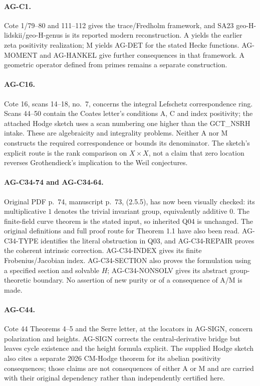 \paragraph{AG-C1.} Cote 1/79--80 and 111--112 gives the trace/Fredholm
framework, and SA23 geo-H-lidskii/geo-H-genus is its reported modern
reconstruction. A yields the earlier zeta positivity realization;
M yields AG-DET for the stated Hecke functions. AG-MOMENT and AG-HANKEL
give further consequences in that framework. A geometric operator defined
from primes remains a separate construction.

\paragraph{AG-C16.} Cote 16, scans 14--18, no.~7, concerns the integral
Lefschetz correspondence ring. Scans 44--50 contain the Coates letter's
conditions A, C and index positivity; the attached Hodge sketch uses a scan
numbering one higher than the GCT\_NSRH intake. These are algebraicity and
integrality problems. Neither A nor M constructs the required
correspondence or bounds its denominator. The sketch's explicit route is
the rank comparison on $X\times X$, not a claim that zero location
reverses Grothendieck's implication to the Weil conjectures.

\paragraph{AG-C34-74 and AG-C34-64.} Original PDF p.~74, manuscript p.~73, (2.5.5),
has now been visually checked: its multiplicative $1$ denotes the trivial
invariant group, equivalently additive $0$. The finite-field curve theorem
is the stated input, so inherited Q04 is unchanged. The original
definitions and full proof route for Theorem 1.1 have also been read.
AG-C34-TYPE identifies the literal obstruction in Q03, and
AG-C34-REPAIR proves the coherent intrinsic correction. AG-C34-INDEX
gives its finite Frobenius/Jacobian index. AG-C34-SECTION also proves
the formulation using a specified section and solvable $H$;
AG-C34-NONSOLV gives its abstract group-theoretic boundary.
No assertion of new purity or
of a consequence of A/M is made.

\paragraph{AG-C44.} Cote 44 Theorems 4--5 and the Serre letter, at the
locators in AG-SIGN, concern polarization and heights. AG-SIGN corrects
the central-derivative bridge but leaves cycle existence and the
height formula explicit. The supplied Hodge sketch also cites a separate
2026 CM-Hodge theorem for its abelian positivity consequences; those
claims are not consequences of either A or M and are carried with
their original dependency rather than independently certified here.

